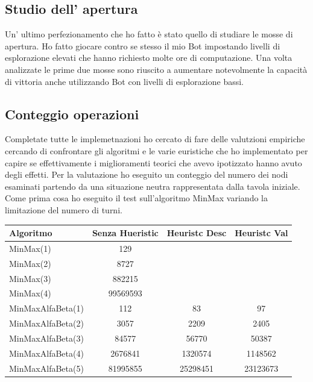 \documentclass[paper=a4, fontsize=11pt]{scrartcl}	%
\numberwithin{equation}{section}															%
\numberwithin{figure}{section}																%
\numberwithin{table}{section}																%
\begin{document}
\subsection{Studio dell' apertura}
Un' ultimo perfezionamento che ho fatto \`e stato quello di studiare le mosse di apertura. Ho fatto giocare contro se stesso il mio Bot impostando livelli di esplorazione elevati che hanno richiesto molte ore di computazione. Una volta analizzate le prime due mosse sono riuscito a aumentare notevolmente la capacit\`a di vittoria anche utilizzando Bot con livelli di esplorazione bassi.
\subsection{Conteggio operazioni}
Completate tutte le implemetnazioni ho cercato di fare delle valutzioni empiriche cercando di confrontare gli algoritmi e le varie euristiche che ho implementato per capire se effettivamente i miglioramenti teorici che avevo ipotizzato hanno avuto degli effetti.
Per la valutazione ho eseguito un conteggio del numero dei nodi esaminati partendo da una situazione neutra rappresentata dalla tavola iniziale. Come prima cosa ho eseguito il test sull'algoritmo MinMax variando la limitazione del numero di turni.
\begin{table} [h]
    \begin{tabular}{lccc}
        \hline
        Algoritmo & Senza Hueristic & Heuristc Desc\footnotemark[1] & Heuristc Val\footnotemark[2]\\ \hline
        MinMax(1) & 129 & ~ & ~ \\ 
        MinMax(2) & 8727 & ~ & ~ \\ 
        MinMax(3) & 882215 & ~ & ~ \\ 
        MinMax(4) & 99569593 & ~ & ~ \\ 
        MinMaxAlfaBeta(1) & 112 & 83 & 97 \\ 
        MinMaxAlfaBeta(2) & 3057 & 2209 & 2405 \\ 
        MinMaxAlfaBeta(3) & 84577 & 56770 & 50387 \\ 
        MinMaxAlfaBeta(4) & 2676841 & 1320574 & 1148562 \\ 
        MinMaxAlfaBeta(5) & 81995855 & 25298451 & 23123673\\ 
        \hline


    \end{tabular}
\end{table}
\end{document}
